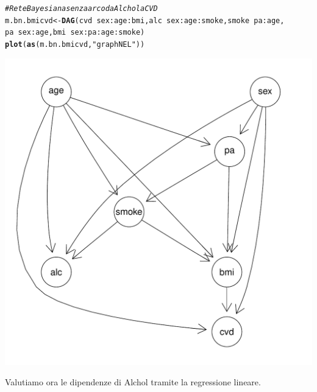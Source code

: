 \documentclass{article}\usepackage[]{graphicx}\usepackage[]{xcolor}
\makeatletter
\def\maxwidth{ %
  \ifdim\Gin@nat@width>\linewidth
    \linewidth
  \else
    \Gin@nat@width
  \fi
}
\newcommand{\hlstr}[1]{\textcolor[rgb]{0.192,0.494,0.8}{#1}}%
\newcommand{\hlcom}[1]{\textcolor[rgb]{0.678,0.584,0.686}{\textit{#1}}}%
\newcommand{\hlopt}[1]{\textcolor[rgb]{0,0,0}{#1}}%
\newcommand{\hlstd}[1]{\textcolor[rgb]{0.345,0.345,0.345}{#1}}%
\newcommand{\hlkwb}[1]{\textcolor[rgb]{0.69,0.353,0.396}{#1}}%
\newcommand{\hlkwd}[1]{\textcolor[rgb]{0.737,0.353,0.396}{\textbf{#1}}}%
\newenvironment{kframe}{%
 \def\at@end@of@kframe{}%
 \ifinner\ifhmode%
  \def\at@end@of@kframe{\end{minipage}}%
  \begin{minipage}{\columnwidth}%
 \fi\fi%
 \def\FrameCommand##1{\hskip\@totalleftmargin \hskip-\fboxsep
 \colorbox{shadecolor}{##1}\hskip-\fboxsep
     \hskip-\linewidth \hskip-\@totalleftmargin \hskip\columnwidth}%
 \MakeFramed {\advance\hsize-\width
   \@totalleftmargin\z@ \linewidth\hsize
   \@setminipage}}%
 {\par\unskip\endMakeFramed%
 \at@end@of@kframe}
\newenvironment{knitrout}{}{} %
\makeatother
\begin{document}
\begin{knitrout}
\color{fgcolor}\begin{kframe}
\begin{alltt}
\hlcom{#Rete Bayesiana senza arco da Alchol a CVD}
\hlstd{m.bn.bmicvd} \hlkwb{<-} \hlkwd{DAG}\hlstd{(cvd}\hlopt{~}\hlstd{sex}\hlopt{:}\hlstd{age}\hlopt{:}\hlstd{bmi, alc}\hlopt{~}\hlstd{sex}\hlopt{:}\hlstd{age}\hlopt{:}\hlstd{smoke, smoke}\hlopt{~}\hlstd{pa}\hlopt{:}\hlstd{age,}
                   \hlstd{pa}\hlopt{~}\hlstd{sex}\hlopt{:}\hlstd{age, bmi}\hlopt{~}\hlstd{sex}\hlopt{:}\hlstd{pa}\hlopt{:}\hlstd{age}\hlopt{:}\hlstd{smoke)}
\hlkwd{plot}\hlstd{(}\hlkwd{as}\hlstd{(m.bn.bmicvd,} \hlstr{"graphNEL"}\hlstd{))}
\end{alltt}
\end{kframe}
\includegraphics[width=\maxwidth]{figure/Rete_Bayesiana_senza_arco_tra_Alchol_e_CVD-1} 
\end{knitrout}
    
    Valutiamo ora le dipendenze di Alchol tramite la regressione lineare.
    
\end{document}
